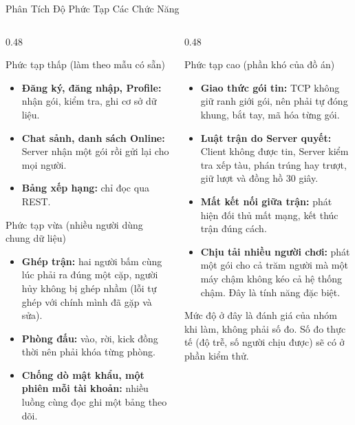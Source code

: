 \begin{frame}[label=phuctap]{Phân Tích Độ Phức Tạp Các Chức Năng}
  \small
  \begin{columns}[T]
    \begin{column}{0.48\textwidth}
      \begin{block}{Phức tạp thấp (làm theo mẫu có sẵn)}
        \begin{itemize}\setlength{\itemsep}{1pt}\scriptsize
          \item \textbf{Đăng ký, đăng nhập, Profile:} nhận gói, kiểm tra, ghi cơ sở dữ liệu.
          \item \textbf{Chat sảnh, danh sách Online:} Server nhận một gói rồi gửi lại cho mọi người.
          \item \textbf{Bảng xếp hạng:} chỉ đọc qua REST.
        \end{itemize}
      \end{block}
      \begin{block}{Phức tạp vừa (nhiều người dùng chung dữ liệu)}
        \begin{itemize}\setlength{\itemsep}{1pt}\scriptsize
          \item \textbf{Ghép trận:} hai người bấm cùng lúc phải ra đúng một cặp, người hủy không bị ghép nhầm (lỗi tự ghép với chính mình đã gặp và sửa).
          \item \textbf{Phòng đấu:} vào, rời, kick đồng thời nên phải khóa từng phòng.
          \item \textbf{Chống dò mật khẩu, một phiên mỗi tài khoản:} nhiều luồng cùng đọc ghi một bảng theo dõi.
        \end{itemize}
      \end{block}
    \end{column}
    \begin{column}{0.48\textwidth}
      \begin{alertblock}{Phức tạp cao (phần khó của đồ án)}
        \begin{itemize}\setlength{\itemsep}{1pt}\scriptsize
          \item \textbf{Giao thức gói tin:} TCP không giữ ranh giới gói, nên phải tự đóng khung, bắt tay, mã hóa từng gói.
          \item \textbf{Luật trận do Server quyết:} Client không được tin, Server kiểm tra xếp tàu, phán trúng hay trượt, giữ lượt và đồng hồ 30 giây.
          \item \textbf{Mất kết nối giữa trận:} phát hiện đối thủ mất mạng, kết thúc trận đúng cách.
          \item \textbf{Chịu tải nhiều người chơi:} phát một gói cho cả trăm người mà một máy chậm không kéo cả hệ thống chậm. Đây là tính năng đặc biệt.
        \end{itemize}
      \end{alertblock}
      \scriptsize Mức độ ở đây là đánh giá của nhóm khi làm, không phải số đo. Số đo thực tế (độ trễ, số người chịu được) sẽ có ở phần kiểm thử.
    \end{column}
  \end{columns}
\end{frame}

